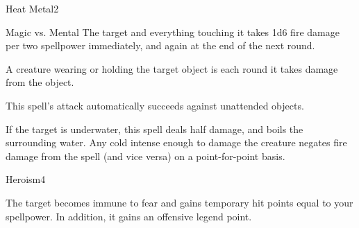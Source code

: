 \begin{spellsection}{Heat Metal}{2}
    \begin{spellheader}
    \end{spellheader}
    \begin{spellcontent}
        \begin{spelltargetinginfo}
        \end{spelltargetinginfo}
        \begin{spelleffects}
            \begin{spellattack}{Magic vs. Mental}
                \spellsuccess The target and everything touching it takes 1d6 fire damage per two spellpower immediately, and again at the end of the next round.

                A creature wearing or holding the target object is \dazed each round it takes damage from the object.
            \end{spellattack}
        \end{spelleffects}
    \end{spellcontent}
    \begin{spellfooter}
        \spellnotes This spell's attack automatically succeeds against unattended objects.

        If the target is underwater, this spell deals half damage, and boils the surrounding water. Any cold intense enough to damage the creature negates fire damage from the spell (and vice versa) on a point-for-point basis.
        \miscastrandom
    \end{spellfooter}
\end{spellsection}

\begin{spellsection}{Heroism}{4}
    \begin{spellheader}
    \end{spellheader}
    \begin{spellcontent}
        \begin{spelltargetinginfo}
        \end{spelltargetinginfo}
        \begin{spelleffects}
            \spelleffect The target becomes immune to fear and gains temporary hit points equal to your spellpower. In addition, it gains an offensive legend point.
            \spelldur \durshort \dismissable
        \end{spelleffects}
    \end{spellcontent}
    \begin{spellfooter}
        \miscastrandom
    \end{spellfooter}
\end{spellsection}

